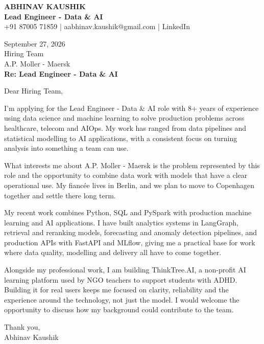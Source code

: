 \documentclass[10pt,a4paper]{article}
\begin{document}
\begin{center}
{\Large\bfseries ABHINAV KAUSHIK}\\[2pt]
{\bfseries Lead Engineer - Data \& AI}\\[2pt]
+91 87005 71859 \quad | \quad aabhinav.kaushik@gmail.com \quad | \quad LinkedIn
\end{center}
\vspace{8pt}
September 27, 2026\\[6pt]
Hiring Team\\
A.P. Moller - Maersk\\[4pt]
\textbf{Re: Lead Engineer - Data \& AI}

Dear Hiring Team,

I’m applying for the Lead Engineer - Data \& AI role with 8+ years of experience using data science and machine learning to solve production problems across healthcare, telecom and AIOps. My work has ranged from data pipelines and statistical modelling to AI applications, with a consistent focus on turning analysis into something a team can use.

What interests me about A.P. Moller - Maersk is the problem represented by this role and the opportunity to combine data work with models that have a clear operational use. My fiancée lives in Berlin, and we plan to move to Copenhagen together and settle there long term.

My recent work combines Python, SQL and PySpark with production machine learning and AI applications. I have built analytics systems in LangGraph, retrieval and reranking models, forecasting and anomaly detection pipelines, and production APIs with FastAPI and MLflow, giving me a practical base for work where data quality, modelling and delivery all have to come together.

Alongside my professional work, I am building ThinkTree.AI, a non-profit AI learning platform used by NGO teachers to support students with ADHD. Building it for real users keeps me focused on clarity, reliability and the experience around the technology, not just the model. I would welcome the opportunity to discuss how my background could contribute to the team.

Thank you,\\
Abhinav Kaushik
\end{document}
